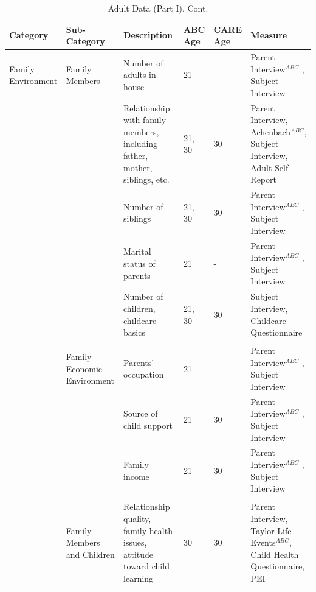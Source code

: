 \documentclass[static]{JJH-Beamer}
\begin{document}
\begin{frame}
 \addtocounter{framenumber}{-1}

\begin{table}[H]
\addtocounter{table}{-1}
\caption{Adult Data (Part I), Cont.}						
\begin{center}
\begin{tiny}						
\begin{tabular}{L{1.2cm} C{1.4cm} C{2.5cm} C{.8cm} C{.8cm} C{2.9cm}}										
\toprule
\textbf{Category}	&	\textbf{Sub-Category}	&	\textbf{Description}	&	\textbf{ABC Age}  	&  \textbf{CARE Age}  & 	\textbf{Measure}	\\ \midrule																
Family Environment      	&	       Family Members  	&	       Number of adults in house       	&	21	&	-	&	       Parent Interview$^{ABC}$ , Subject Interview    \\
        	&	               	&	       Relationship with family members, including father, mother, siblings, etc.      	&	       21, 30  	&	30	&	      Parent Interview, Achenbach$^{ABC}$, Subject Interview, Adult Self Report \\
        	&	               	&	       Number of siblings      	&	       21, 30  	&	30	&	       Parent Interview$^{ABC}$ , Subject Interview    \\
        	&	               	&	       Marital status of parents       	&	21	&	-	&	       Parent Interview$^{ABC}$ , Subject Interview    \\
        	&	               	&	       Number of children, childcare basics    	&	       21, 30  	&	30	&	       Subject Interview, Childcare Questionnaire      \\
\\										
        	&	       Family Economic Environment     	&	       Parents' occupation     	&	21	&	-	&	       Parent Interview$^{ABC}$ , Subject Interview    \\
        	&	               	&	       Source of child support 	&	21	&	30	&	       Parent Interview$^{ABC}$ , Subject Interview    \\
        	&	               	&	       Family income   	&	21	&	30	&	       Parent Interview$^{ABC}$ , Subject Interview    \\
\\										
        	&	       Family Members and Children	&	Relationship quality, family health issues, attitude toward child learning	&	30	&	30	&	       Parent Interview, Taylor Life Events$^{ABC}$, Child Health Questionnaire, PEI    \\
\bottomrule							
\end{tabular}										
\end{tiny}
\end{center}							
\end{table}

\end{frame}
\end{document}
